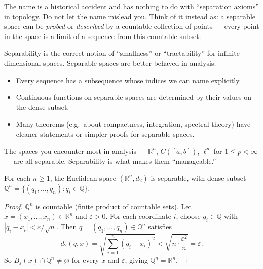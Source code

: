 \begin{remark*}
The name is a historical accident and has nothing to do with
``separation axioms'' in topology.
Do not let the name mislead you.
Think of it instead as: a separable space can be
\emph{probed} or \emph{described} by a countable collection of points ---
every point in the space is a limit of a sequence from this countable subset.
\end{remark*}

\begin{remark*}
Separability is the correct notion of ``smallness'' or ``tractability''
for infinite-dimensional spaces.
Separable spaces are better behaved in analysis:
\begin{itemize}
  \item Every sequence has a subsequence whose indices we can name explicitly.
  \item Continuous functions on separable spaces are determined by their
        values on the dense subset.
  \item Many theorems (e.g.\ about compactness, integration, spectral theory)
        have cleaner statements or simpler proofs for separable spaces.
\end{itemize}
The spaces you encounter most in analysis --- $\mathbb{R}^n$,
$C([a,b])$, $\ell^p$ for $1 \le p < \infty$ --- are all separable.
Separability is what makes them ``manageable.''
\end{remark*}

\begin{proposition}
\label{prop:Rn-separable}
For each $n \ge 1$, the Euclidean space $(\mathbb{R}^n, d_2)$ is separable,
with dense subset $\mathbb{Q}^n = \{(q_1, \ldots, q_n) : q_i \in \mathbb{Q}\}$.
\end{proposition}

\begin{proof}
$\mathbb{Q}^n$ is countable (finite product of countable sets).
Let $x = (x_1, \ldots, x_n) \in \mathbb{R}^n$ and $\varepsilon > 0$.
For each coordinate $i$, choose $q_i \in \mathbb{Q}$ with
$|q_i - x_i| < \varepsilon / \sqrt{n}$.
Then $q = (q_1, \ldots, q_n) \in \mathbb{Q}^n$ satisfies
\[
d_2(q, x)
= \sqrt{\sum_{i=1}^n (q_i - x_i)^2}
< \sqrt{n \cdot \frac{\varepsilon^2}{n}}
= \varepsilon.
\]
So $B_\varepsilon(x) \cap \mathbb{Q}^n \neq \varnothing$ for every $x$ and $\varepsilon$,
giving $\overline{\mathbb{Q}^n} = \mathbb{R}^n$.
\end{proof}

